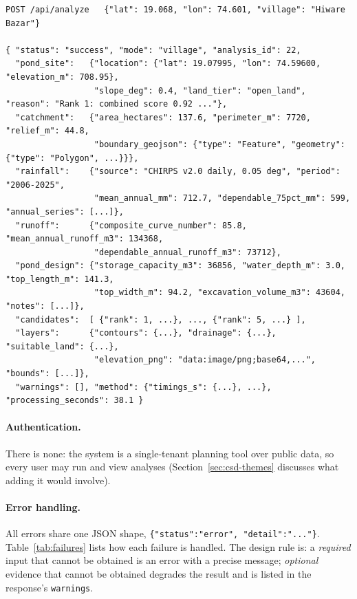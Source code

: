 \documentclass[manuscript,screen,review]{acmart}
\newcommand{\code}[1]{\texttt{\small #1}}
\begin{document}
\begin{lstlisting}[caption={Request and abridged response of \texttt{POST /api/analyze} (Hiware Bazar).},label={lst:response},captionpos=b]
POST /api/analyze   {"lat": 19.068, "lon": 74.601, "village": "Hiware Bazar"}

{ "status": "success", "mode": "village", "analysis_id": 22,
  "pond_site":   {"location": {"lat": 19.07995, "lon": 74.59600, "elevation_m": 708.95},
                  "slope_deg": 0.4, "land_tier": "open_land", "reason": "Rank 1: combined score 0.92 ..."},
  "catchment":   {"area_hectares": 137.6, "perimeter_m": 7720, "relief_m": 44.8,
                  "boundary_geojson": {"type": "Feature", "geometry": {"type": "Polygon", ...}}},
  "rainfall":    {"source": "CHIRPS v2.0 daily, 0.05 deg", "period": "2006-2025",
                  "mean_annual_mm": 712.7, "dependable_75pct_mm": 599, "annual_series": [...]},
  "runoff":      {"composite_curve_number": 85.8, "mean_annual_runoff_m3": 134368,
                  "dependable_annual_runoff_m3": 73712},
  "pond_design": {"storage_capacity_m3": 36856, "water_depth_m": 3.0, "top_length_m": 141.3,
                  "top_width_m": 94.2, "excavation_volume_m3": 43604, "notes": [...]},
  "candidates":  [ {"rank": 1, ...}, ..., {"rank": 5, ...} ],
  "layers":      {"contours": {...}, "drainage": {...}, "suitable_land": {...},
                  "elevation_png": "data:image/png;base64,...", "bounds": [...]},
  "warnings": [], "method": {"timings_s": {...}, ...}, "processing_seconds": 38.1 }
\end{lstlisting}

\paragraph{Authentication.} There is none: the system is a single-tenant planning tool over
public data, so every user may run and view analyses (Section~\ref{sec:csd-themes} discusses
what adding it would involve).

\paragraph{Error handling.} All errors share one JSON shape, \code{\{"status":"error",
"detail":"..."\}}. Table~\ref{tab:failures} lists how each failure is handled. The design rule
is: a \emph{required} input that cannot be obtained is an error with a precise message;
\emph{optional} evidence that cannot be obtained degrades the result and is listed in the
response's \code{warnings}.
\end{document}
